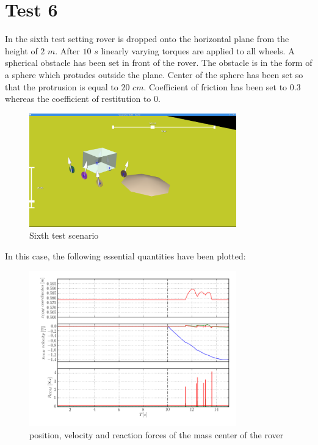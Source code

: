 \newpage
\section{Test 6}
\label{Sec:test_6}

In the sixth test setting rover is dropped onto the horizontal plane from the height of $2$ $m$. After $10$ $s$ linearly varying torques are applied to all wheels. 
A spherical obstacle has been set in front of the rover. The obstacle is in the form of a sphere which protudes outside the plane.
Center of the sphere has been set so that the protrusion is equal to $20$ $cm$. Coefficient of friction has been set to 0.3 whereas the coefficient of restitution to 0.

\begin{figure}[H]
  \centering
    \includegraphics[width=0.8\textwidth]{run_6}
  \caption{Sixth test scenario}
\end{figure}

\noindent In this case, the following essential quantities have been plotted:

\begin{figure}[H]
  \centering
    \includegraphics[width=0.8\textwidth]{xvpCOM6}
  \caption{position, velocity and reaction forces of the mass center of the rover}
\end{figure}

